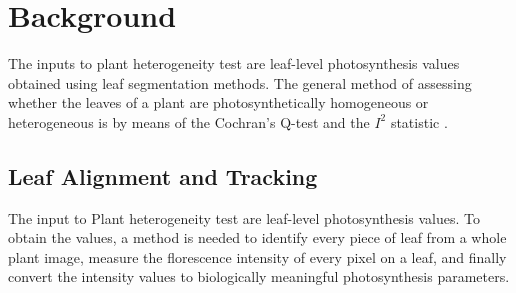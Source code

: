 \documentclass{bioinfo}
\begin{document}
\section{Background}
The inputs to plant heterogeneity test are leaf-level photosynthesis values obtained using leaf segmentation methods. The general method of assessing whether the leaves of a plant are photosynthetically homogeneous or heterogeneous is by means of the Cochran's Q-test \citep{conover1999Practical} and the $I^2$ statistic \citep{higgins2002quantifying,higgins2003measuring}.


%
%
%









\subsection{Leaf Alignment and Tracking}\label{sec:alignment}

The input to Plant heterogeneity test are leaf-level photosynthesis values. To obtain the values, a method is needed to identify every piece of leaf from a whole plant image, measure the florescence intensity of every pixel on a leaf, and finally convert the intensity values to biologically meaningful photosynthesis parameters.
\end{document}
